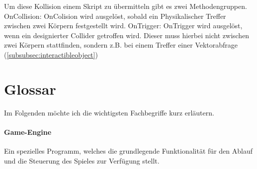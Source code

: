 Um diese Kollision einem Skript zu übermitteln gibt es zwei Methodengruppen.
OnCollision: OnColision wird ausgelöst, sobald ein Physikalischer Treffer zwischen zwei Körpern festgestellt wird.
OnTrigger: OnTrigger wird ausgelöst, wenn ein designierter Collider getroffen wird. Dieser muss hierbei nicht zwischen zwei Körpern stattfinden, sondern z.B. bei einem Treffer einer Vektorabfrage (\cref{subsubsec:interactibleobject})

\section{Glossar}

Im Folgenden möchte ich die wichtigsten Fachbegriffe kurz erläutern. 

\paragraph{Game-Engine}
Ein spezielles Programm, welches die grundlegende Funktionalität für den Ablauf und die Steuerung des Spieles zur Verfügung stellt.



